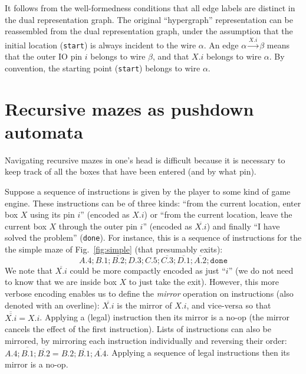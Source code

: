\documentclass[a4paper,UKenglish,cleveref, autoref]{lipics-v2021}
\begin{document}
It follows from the well-formedness conditions that all edge labels are distinct
in the dual representation graph. The original ``hypergraph'' representation can
be reassembled from the dual representation graph, under the assumption that the
initial location (\texttt{start}) is always incident to the wire $\alpha$. An
edge $\alpha \xrightarrow{X.i} \beta$ means that the outer IO pin $i$ belongs to
wire $\beta$, and that $X.i$ belongs to wire $\alpha$. By convention, the
starting point (\texttt{start}) belongs to wire $\alpha$.

\section{Recursive mazes as pushdown automata}
\label{sec:pda}

Navigating recursive mazes in one's head is difficult because it is necessary to
keep track of all the boxes that have been entered (and by what pin).

Suppose a sequence of instructions is given by the player to some kind of game
engine. These instructions can be of three kinds: ``from the current location,
enter box $X$ using its pin $i$'' (encoded as $X.i$) or ``from the current
location, leave the current box $X$ through the outer pin $i$'' (encoded as $\overline{X.i}$) and finally ``I have solved the problem'' (\texttt{done}). For
instance, this is a sequence of instructions for the the simple maze of
Fig.~\ref{fig:simple} (that presumably exits):
\[
  A.4; B.1; \overline{B.2}; D.3; C.5; \overline{C.3}; \overline{D.1}; \overline{A.2}; \texttt{done}
\]
We note that $\overline{X.i}$ could be more compactly encoded as just ``$i$''
(we do not need to know that we are inside box $X$ to just take the
exit). However, this more verbose encoding enables us to define the
\emph{mirror} operation on instructions (also denoted with an overline):
$\overline{X.i}$ is the mirror of $X.i$, and vice-versa so that
$\overline{\overline{X.i}} = X.i$. Applying a (legal) instruction then its
mirror is a no-op (the mirror cancels the effect of the first instruction).
Lists of instructions can also be mirrored, by mirroring each instruction
individually and reversing their order:
$\overline{A.4; B.1; \overline{B.2}} = B.2; \overline{B.1};
\overline{A.4}$. Applying a sequence of legal instructions then its mirror is a
no-op.
\end{document}
